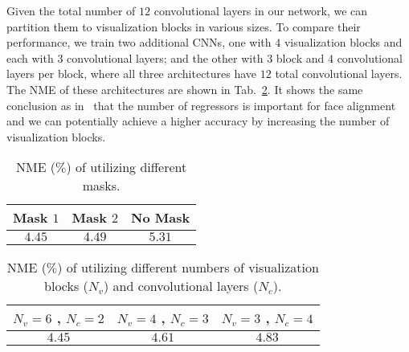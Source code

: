 Given the total number of $12$ convolutional layers in our network, we can partition them to visualization blocks in various sizes.
To compare their performance, we train two additional CNNs, one with $4$ visualization blocks and each with $3$ convolutional layers; and the other with $3$ block and $4$ convolutional layers per block, where all three architectures have $12$ total convolutional layers.
The NME of these architectures are shown in Tab.~\ref{table:VBNum}. 
It shows the same conclusion as in~\cite{burgos2013robust} that the number of regressors is important for face alignment and we can potentially achieve a higher accuracy by increasing the number of visualization blocks. 

\begin{table}[t!]\small
\caption{NME ($\%$) of utilizing different masks.}
\begin{center}
\begin{tabular}{ c|c|c } 
 \hline
 Mask $1$ & Mask $2$ & No Mask \\ 
 \hline
 $4.45$ & $4.49$ & $5.31$ \\
 \hline  
\end{tabular}
\end{center}
\label{table:mask}\figvspace
\vspace{-3mm}
\end{table}

\begin{table}[t!]\small
\caption{NME ($\%$) of utilizing different numbers of visualization blocks ($N_v$) and convolutional layers ($N_c$).} \figvspace
\begin{center}
\begin{tabular}{ c|c|c } 
 \hline
 $N_v=6$ , $N_c=2$ &  $N_v=4$ , $N_c=3$ &  $N_v=3$ , $N_c=4$ \\ 
 \hline
 $4.45$ & $4.61$ & $4.83$ \\
 \hline  
\end{tabular}
\end{center}
\label{table:VBNum}\figvspace\vspace{-6mm}
\end{table}

